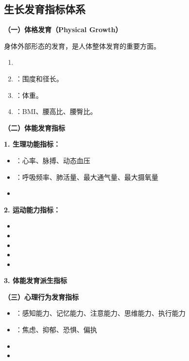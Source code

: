 \subsection{生长发育指标体系}

\begin{defbox}
\textbf{（一）体格发育（Physical Growth）}

身体外部形态的发育，是人体整体发育的重要方面。

\begin{enumerate}[leftmargin=*]
    \item {}
    \item {}：围度和径长。
    \item {}：体重。
    \item {}：BMI、腰高比、腰臀比。
\end{enumerate}
\end{defbox}

\begin{keybox}
\textbf{（二）体能发育指标}

\textbf{1. 生理功能指标：}
\begin{itemize}[leftmargin=*]
    \item {}：心率、脉搏、动态血压
    \item {}：呼吸频率、肺活量、最大通气量、最大摄氧量
    \item {}
\end{itemize}

\textbf{2. 运动能力指标：}
\begin{itemize}[leftmargin=*]
    \item {}
    \item {}
    \item {}
    \item {}
    \item {}
\end{itemize}

\textbf{3. 体能发育派生指标}
\end{keybox}

\begin{keybox}
\textbf{（三）心理行为发育指标}

\begin{itemize}[leftmargin=*]
    \item {}：感知能力、记忆能力、注意能力、思维能力、执行能力
    \item {}：焦虑、抑郁、恐惧、偏执
    \item {}
    \item {}
\end{itemize}
\end{keybox}


